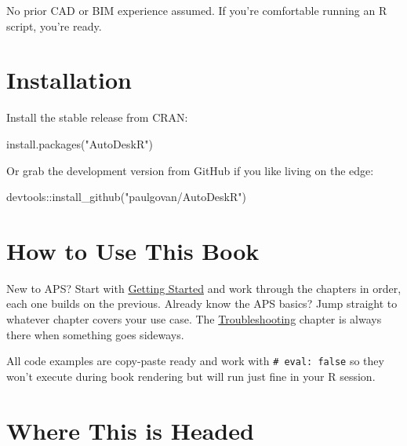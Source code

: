 \documentclass[
  11pt,
  letterpaper,
  DIV=11,
  numbers=noendperiod]{scrreprt}
\newenvironment{Shaded}{\begin{snugshade}}{\end{snugshade}}
\newcommand{\FunctionTok}[1]{\textcolor[rgb]{0.28,0.35,0.67}{#1}}
\newcommand{\NormalTok}[1]{\textcolor[rgb]{0.00,0.23,0.31}{#1}}
\newcommand{\SpecialCharTok}[1]{\textcolor[rgb]{0.37,0.37,0.37}{#1}}
\newcommand{\StringTok}[1]{\textcolor[rgb]{0.13,0.47,0.30}{#1}}
\begin{document}
No prior CAD or BIM experience assumed. If you're comfortable running an
R script, you're ready.

\section*{Installation}\label{installation}


Install the stable release from CRAN:

\begin{Shaded}
\begin{Highlighting}[]
\FunctionTok{install.packages}\NormalTok{(}\StringTok{"AutoDeskR"}\NormalTok{)}
\end{Highlighting}
\end{Shaded}

Or grab the development version from GitHub if you like living on the
edge:

\begin{Shaded}
\begin{Highlighting}[]
\NormalTok{devtools}\SpecialCharTok{::}\FunctionTok{install\_github}\NormalTok{(}\StringTok{"paulgovan/AutoDeskR"}\NormalTok{)}
\end{Highlighting}
\end{Shaded}

\section*{How to Use This Book}\label{how-to-use-this-book}


New to APS? Start with \href{getting-started.qmd}{Getting Started} and
work through the chapters in order, each one builds on the previous.
Already know the APS basics? Jump straight to whatever chapter covers
your use case. The \href{troubleshooting.qmd}{Troubleshooting} chapter
is always there when something goes sideways.

All code examples are copy-paste ready and work with
\texttt{\#\textbar{}\ eval:\ false} so they won't execute during book
rendering but will run just fine in your R session.

\section*{Where This is Headed}\label{where-this-is-headed}
\end{document}
